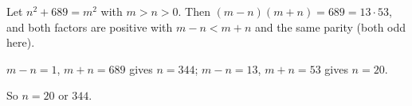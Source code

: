 Let $n^2+689=m^2$ with $m>n>0$. Then $(m-n)(m+n)=689=13\cdot53$, and both factors are positive with $m-n<m+n$ and the same parity (both odd here).

$m-n=1$, $m+n=689$ gives $n=344$; $m-n=13$, $m+n=53$ gives $n=20$.

So $n=\boxed{20\text{ or }344}$.
